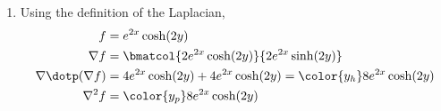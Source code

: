 \begin{enumerate}
    \item Using the definition of the Laplacian,
          \begin{align}
              f                       & = e^{2x} \cosh(2y)                             \\
              \nabla f                & = \bmatcol{2e^{2x}\cosh(2y)}{2e^{2x}\sinh(2y)} \\
              \nabla \dotp (\nabla f) & = 4e^{2x}\cosh(2y) + 4e^{2x}\cosh(2y)
              = \color{y_h} 8e^{2x}\cosh(2y)                                           \\
              \nabla^2 f              & = \color{y_p} 8e^{2x}\cosh(2y)
          \end{align}
\end{enumerate}